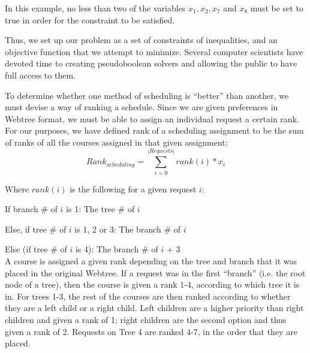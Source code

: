 In this example, no less than two of the variables $x_1, x_2, x_7$ and $x_8$
must be set to true in order for the constraint to be satisfied.

Thus, we set up our problem as a set of
constraints of inequalities, and an objective function that we attempt
to minimize. Several computer scientists have devoted time to creating
pseudoboolean solvers and allowing the public to have full access to
them.

To determine whether one method of scheduling is ``better'' than
another, we must devise a way of ranking a schedule. Since we are
given preferences in Webtree format, we must be able to assign an
individual request a certain rank. For our purposes, we have defined
rank of a scheduling assignment to be the sum of ranks of all the
courses assigned in that given assignment: \begin{equation}\label{rank}Rank_{scheduling} =
  \sum_{i=0}^{|Requests|}{rank(i)*x_i}\end{equation} 

Where $rank(i)$ is the following for a given request $i$:

If branch $\#$ of $i$ is 1: The tree $\#$ of $i$

Else, if tree $\#$ of $i$ is 1, 2 or 3: The branch $\#$ of $i$

Else (if tree $\#$ of $i$ is 4): The branch $\#$ of $i$ + 3\\

A course is assigned a given rank depending on the tree and branch
that it was placed in the original Webtree. If a request was in the
first ``branch'' (i.e. the root node of a tree), then the course is given
a rank {1-4}, according to which tree it is in. For trees {1-3}, the
rest of the courses are then ranked according to whether they are a
left child or a right child. Left children are a higher priority than right
children and given a rank of 1; right children are the second option
and thus given a rank of 2. Requests on Tree 4 are ranked {4-7}, in
the order that they are placed.



